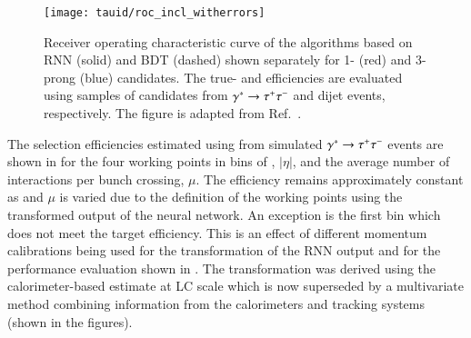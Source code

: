\begin{figure}[htbp]
  \centering

  \texttt{[image: tauid/roc\_incl\_witherrors]}

  \caption{Receiver operating characteristic curve of the \tauid
    algorithms based on RNN (solid) and BDT (dashed) shown separately
    for 1- (red) and 3-prong (blue) candidates. The true- and
    \faketauhadvis efficiencies are evaluated using samples of
    \tauhadvis candidates from $\gamma^{*} \to \tau^{+} \tau^{-}$ and dijet
    events, respectively.  The figure is adapted from
    Ref.~\cite{ATL-PHYS-PUB-2019-033}.}%
  \label{fig:tauid_rnn_bdt_roc_comparison}
\end{figure}

The \truetauhadvis selection efficiencies estimated using \tauhadvis
from simulated $\gamma^{*} \to \tau^{+} \tau^{-}$ events are shown in
 for the four working points in bins of
\tauhadvis \pT, \tauhadvis $|\eta|$, and the average number of
interactions per bunch crossing, $\mu$. The efficiency remains
approximately constant as \tauhadvis \pT and $\mu$ is varied due to
the definition of the working points using the transformed output of
the neural network. An exception is the first \tauhadvis \pT bin which
does not meet the target efficiency. This is an effect of different
\tauhadvis momentum calibrations being used for the transformation of
the RNN output and for the performance evaluation shown in
. The
transformation was derived using the calorimeter-based \tauhadvis \pT
estimate at LC scale which is now superseded by a multivariate method
combining information from the calorimeters and tracking systems
(shown in the figures).

